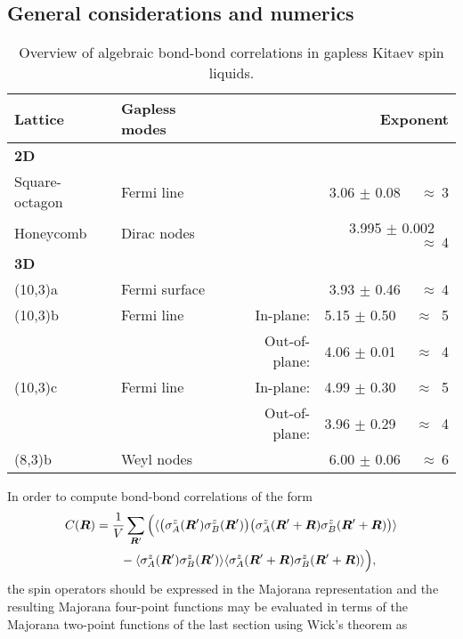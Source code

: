 \subsection{General considerations and numerics}
\label{section:chapter07_BondBondGeneral}
%
%
%
\begin{table}[tb]
	\centering
	\label{my-label}
	\begin{tabular}{llrr}
		\hline
		\textbf{Lattice}             & \textbf{Gapless modes}	&	& \textbf{Exponent}     	\\ \hline
		\textbf{2D}                  & 							&	&							\\
		Square-octagon				 & Fermi line 				&	& 3.06 $\pm$ 0.08~~ 			$\approx~ 3$ \\
		Honeycomb					 & Dirac nodes        		&	& 3.995 $\pm$ 0.002~~ 		$\approx~ 4$ \\
		\textbf{3D}                  & 							&	&							\\
		(10,3)a 					 & Fermi surface     		&	& 3.93 $\pm$ 0.46~~ 			$\approx~ 4$ \\
		(10,3)b						 & Fermi line        		& In-plane:		& 5.15 $\pm$ 0.50~~	 $\approx~$ 5		\\
		& 							& Out-of-plane:	& 4.06 $\pm$ 0.01~~ 	 $\approx~$ 4		\\
		(10,3)c						 & Fermi line        		& In-plane: 	& 4.99 $\pm$ 0.30~~	 $\approx~$ 5		\\
		& 							& Out-of-plane:	& 3.96 $\pm$ 0.29~~	 $\approx~$ 4 		\\
		(8,3)b 						 & Weyl nodes        		&	& 6.00 $\pm$ 0.06~~	 $\approx~ 6$ 		\\
	\end{tabular}
	\caption{
		Overview of algebraic bond-bond correlations in gapless Kitaev spin liquids.
	}
	\label{table:chapter07_BondBondCorrelations}
\end{table}
%
In order to compute bond-bond correlations of the form
%
\begin{align}
	C(\bm{R}) 	&= \frac{1}{V} \sum_{\bm{R}'} \Big( \langle \big(\sigma^z_A(\bm{R}') \sigma^z_B(\bm{R}')\big) \big(\sigma^z_A(\bm{R}'+\bm{R}) \sigma^z_B(\bm{R}'+\bm{R})\big) \rangle\nonumber\\
			&\qquad- \langle \sigma^z_A(\bm{R}') \sigma^z_B(\bm{R}') \rangle \langle \sigma^z_A(\bm{R}'+\bm{R}) \sigma^z_B(\bm{R}'+\bm{R}) \rangle \Big),
\end{align}
%
the spin operators should be expressed in the Majorana representation and the resulting Majorana four-point functions may be evaluated in terms of the Majorana two-point functions of the last section using Wick's theorem as
